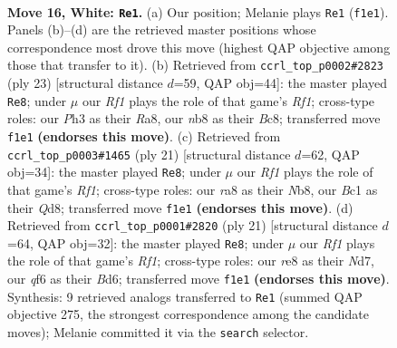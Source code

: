 \documentclass[11pt]{article}
\begin{document}
\clearpage

\begin{figure}[p]\centering
\begin{subfigure}{0.46\textwidth}\centering
\resizebox{\linewidth}{!}{%
\newchessgame
\chessboard[
  setfen={rn2r1k1/pp3pbp/1n3qp1/3p1b2/3P4/1B5P/PPN2PP1/RNBQ1RK1 w - - 3 16},
  showmover=false,
  pgfstyle=straightmove, color=movearrow, markmove={f1-e1}
]}
\caption{}
\end{subfigure}\hfill
\begin{subfigure}{0.46\textwidth}\centering
\resizebox{\linewidth}{!}{%
\newchessgame
\chessboard[
  setfen={r1bq1rk1/pp3ppp/2pb1n2/2n5/3NP3/6P1/PPQ2PBP/RNBR2K1 b - - 2 12},
  showmover=false,
  pgfstyle=straightmove, color=movearrow, markmove={f8-e8}
]}
\caption{}
\end{subfigure}
\\[4pt]
\begin{subfigure}{0.46\textwidth}\centering
\resizebox{\linewidth}{!}{%
\newchessgame
\chessboard[
  setfen={rn1q1rk1/pb1pbppp/3n4/1ppP4/5B2/5NP1/PP3PBP/RN1QR1K1 b - - 9 11},
  showmover=false,
  pgfstyle=straightmove, color=movearrow, markmove={f8-e8}
]}
\caption{}
\end{subfigure}\hfill
\begin{subfigure}{0.46\textwidth}\centering
\resizebox{\linewidth}{!}{%
\newchessgame
\chessboard[
  setfen={r1bq1rk1/pp1n1ppp/3bp3/2p5/2PP4/5N2/PPB2PPP/R1BQ1RK1 b - - 1 11},
  showmover=false,
  pgfstyle=straightmove, color=movearrow, markmove={f8-e8}
]}
\caption{}
\end{subfigure}
\caption{\textbf{Move 16, White: \texttt{Re1}.} (a) Our position; Melanie plays \texttt{Re1} (\texttt{f1e1}). Panels (b)--(d) are the retrieved master positions whose correspondence most drove this move (highest QAP objective among those that transfer to it). (b) Retrieved from \texttt{ccrl\_top\_p0002\#2823} (ply 23) [structural distance $d$=59, QAP obj=44]: the master played \texttt{Re8}; under $\mu$ our \emph{Rf1} plays the role of that game's \emph{Rf1}; cross-type roles: our \emph{P}h3 as their \emph{R}a8, our \emph{n}b8 as their \emph{B}c8; transferred move \texttt{f1e1} \textbf{(endorses this move)}. (c) Retrieved from \texttt{ccrl\_top\_p0003\#1465} (ply 21) [structural distance $d$=62, QAP obj=34]: the master played \texttt{Re8}; under $\mu$ our \emph{Rf1} plays the role of that game's \emph{Rf1}; cross-type roles: our \emph{r}a8 as their \emph{N}b8, our \emph{B}c1 as their \emph{Q}d8; transferred move \texttt{f1e1} \textbf{(endorses this move)}. (d) Retrieved from \texttt{ccrl\_top\_p0001\#2820} (ply 21) [structural distance $d$=64, QAP obj=32]: the master played \texttt{Re8}; under $\mu$ our \emph{Rf1} plays the role of that game's \emph{Rf1}; cross-type roles: our \emph{r}e8 as their \emph{N}d7, our \emph{q}f6 as their \emph{B}d6; transferred move \texttt{f1e1} \textbf{(endorses this move)}. Synthesis: 9 retrieved analogs transferred to \texttt{Re1} (summed QAP objective 275, the strongest correspondence among the candidate moves); Melanie committed it via the \texttt{search} selector.}
\label{fig:thought-m30}
\end{figure}
\end{document}
